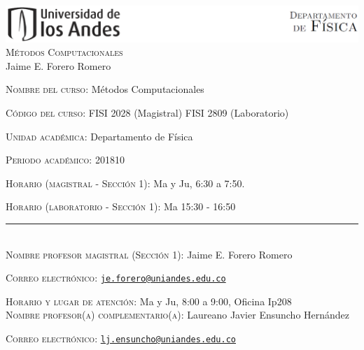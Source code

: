 \documentclass[letterpaper,10pt,onecolumn]{article}
\begin{document}
\begin{center}

\includegraphics[width=490pt]{header.png}\\[0.5cm]

\textsc{\LARGE M\'etodos Computacionales}\\[0.1cm]
\large Jaime E. Forero Romero\\[0.5cm]

\end{center}

\large \noindent\textsc{Nombre del curso:}  M\'etodos Computacionales%
  
\noindent\textsc{C\'odigo del curso:} FISI 2028 (Magistral) FISI 2809 (Laboratorio) %

\noindent\textsc{Unidad acad\'emica:} Departamento de F\'isica

\noindent\textsc{Periodo acad\'emico:} 201810 %

\noindent\textsc{Horario (magistral - Secci\'on 1):} Ma y Ju, 6:30 a 7:50.

\noindent\textsc{Horario (laboratorio - Secci\'on 1):} Ma 15:30 - 16:50

\noindent\rule{\textwidth}{1pt}\\[-0.3cm]

\normalsize \noindent\textsc{Nombre profesor magistral (Secci\'on 1):} Jaime
E. Forero Romero%

\noindent\textsc{Correo electr\'onico:}
\href{mailto:je.forero@uniandes.edu.co}{\nolinkurl{je.forero@uniandes.edu.co}}

\noindent\textsc{Horario y lugar de atenci\'on:} Ma y Ju, 8:00 a 9:00, Oficina Ip208 
\\[-0.1cm]

\noindent\textsc{Nombre profesor(a) complementario(a):} 
Laureano Javier Ensuncho Hern\'andez

\noindent\textsc{Correo electr\'onico:}
\href{mailto: lj.ensuncho@uniandes.edu.co}{\nolinkurl{lj.ensuncho@uniandes.edu.co}}
\end{document}
